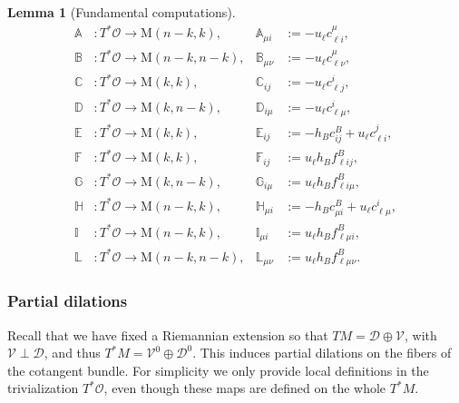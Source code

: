 \documentclass[11pt,a4paper]{article}
\theoremstyle{plain}
\newtheorem{lemma}[theorem]{Lemma}
\theoremstyle{definition}
\theoremstyle{remark}
\numberwithin{equation}{section}
\newcommand{\A}{\mathbb{A}}
\newcommand{\B}{\mathbb{B}}
\newcommand{\C}{\mathbb{C}}
\newcommand{\D}{\mathbb{D}}
\newcommand{\E}{\mathbb{E}}
\newcommand{\F}{\mathbb{F}}
\newcommand{\G}{\mathbb{G}}
\renewcommand{\H}{\mathbb{H}}
\newcommand{\I}{\mathbb{I}}
\renewcommand{\L}{\mathbb{L}}
\newcommand{\distr}{\mathscr{D}}
\newcommand{\ver}{\mathscr{V}}
\begin{document}
\begin{lemma}[Fundamental computations]
\begin{align}
\A & : T^*\mathcal{O} \to \mathrm{M}(n-k, k), & \A_{\mu i} & := - u_\ell c_{\ell i}^\mu,  \\
\B & : T^*\mathcal{O} \to \mathrm{M}(n-k, n-k), & \B_{\mu \nu} & := - u_\ell c_{\ell\nu}^\mu,\\
\C & : T^*\mathcal{O} \to \mathrm{M}(k, k), & \C_{i j} & := - u_\ell c_{\ell j}^i, \\
\D & : T^*\mathcal{O} \to \mathrm{M}(k, n-k),& \D_{i \mu} & := - u_\ell c_{\ell \mu}^i, \\
\E & : T^*\mathcal{O} \to \mathrm{M}(k, k), & \E_{ij} & := -h_Bc_{ij}^B + u_\ell c_{\ell i}^j,   \\
\F & : T^*\mathcal{O} \to \mathrm{M}(k, k), & \F_{ij} & := u_\ell h_B f_{\ell i j}^B, \\
\G & : T^*\mathcal{O} \to \mathrm{M}(k, n-k),& \G_{i \mu} & := u_\ell h_B f_{\ell i \mu}^B, \\
\H & : T^*\mathcal{O} \to \mathrm{M}(n-k, k), & \H_{\mu i} & := - h_B c^{B}_{\mu i}+u_\ell c_{\ell \mu}^i,  \\
\I & : T^*\mathcal{O} \to \mathrm{M}(n-k, k), & \I_{\mu i} & :=  u_\ell h_B f_{\ell \mu i}^B, \\
\L & : T^*\mathcal{O} \to \mathrm{M}(n-k, n-k),& \L_{\mu \nu} & := u_\ell h_B f_{\ell \mu \nu}^B.
\end{align}
\end{lemma}

\subsubsection{Partial dilations}

Recall that we have fixed a Riemannian extension so that $TM = \distr \oplus \ver$, with $\ver \perp \distr$, and thus $T^*M =\ver^0 \oplus \distr^0$. This induces partial dilations on the fibers of the cotangent bundle. For simplicity we only provide local definitions in the trivialization $T^*\mathcal{O}$, even though these maps are defined on the whole $T^*M$.
\end{document}
